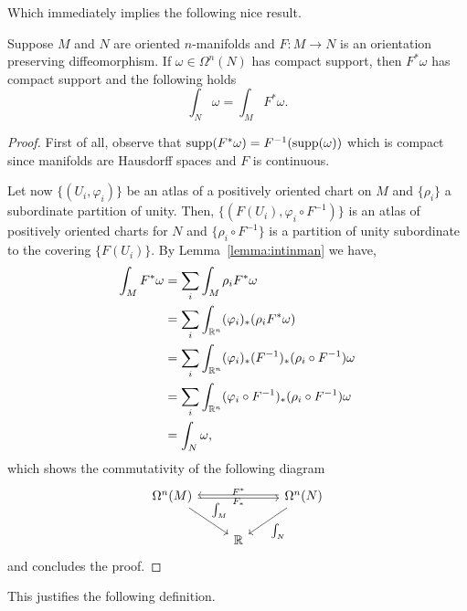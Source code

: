 Which immediately implies the following nice result.
\begin{theorem}\label{thm:gcv}
  Suppose $M$ and $N$ are oriented $n$-manifolds and $F:M\to N$ is an orientation preserving diffeomorphism.
  If $\omega\in\Omega^n(N)$ has compact support, then $F^*\omega$ has compact support and the following holds
  \begin{equation}
    \int_N \omega = \int_M F^* \omega.
  \end{equation}
\end{theorem}
\begin{proof}
  First of all, observe that $\operatorname{supp}(F^*\omega) = F^{-1}(\operatorname{supp}(\omega))$ which is compact since manifolds are Hausdorff spaces and $F$ is continuous.

  Let now $\{(U_i,\varphi_i)\}$ be an atlas of a positively oriented chart on $M$ and $\{\rho_i\}$ a subordinate partition of unity.
  Then, $\{(F(U_i),\varphi_i\circ F^{-1})\}$ is an atlas of positively oriented charts for $N$ and $\{\rho_i \circ F^{-1}\}$ is a partition of unity subordinate to the covering $\{F(U_i)\}$.
  By Lemma~\ref{lemma:intinman} we have,
  \begin{align}
    \int_M F^*\omega &= \sum_i \int_M \rho_i F^*\omega \\
    &= \sum_i \int_{\mathbb{R}^n}(\varphi_i)_*(\rho_i F^*\omega)\\
    &= \sum_i \int_{\mathbb{R}^n}(\varphi_i)_*(F^{-1})_*(\rho_i \circ F^{-1}) \omega \\
    &= \sum_i \int_{\mathbb{R}^n}(\varphi_i \circ F^{-1})_*(\rho_i \circ F^{-1}) \omega \\
    &= \int_N\omega,
  \end{align}
  which shows the commutativity of the following diagram
  \begin{equation}
    \begin{tikzcd}
      \Omega^n(M)
        \arrow[rr, "F^*", above, shift right = 0.5]
        \arrow[dr, "\int_M", below left]
        & & \Omega^n(N)
          \arrow[ll, "F_*", below, shift right = 0.5]
          \arrow[dl, "\int_N"] \\
      & \R &
    \end{tikzcd}
  \end{equation}
  and concludes the proof.
\end{proof}

This justifies the following definition.

